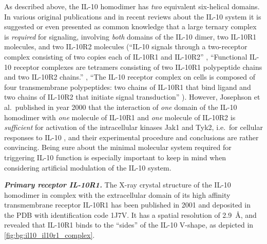As described above, the IL-10 homodimer has \textit{two} equivalent six-helical
domains. In various original publications and in recent reviews about the IL-10
system it is suggested or even presented as common knowledge that a large
ternary complex is \textit{required} for signaling, involving \textit{both}
domains of the IL-10 dimer, two IL-10R1 molecules, and two IL-10R2 molecules
(\enquote{IL-10 signals through a two-receptor complex consisting of two copies
each of IL-10R1 and IL-10R2} \cite{mosser_il10_newperspectives_2008},
\enquote{Functional IL-10 receptor complexes are tetramers consisting
of two IL-10R1 polypeptide chains and two IL-10R2 chains.}
\cite{donnelly_finbloom_il10_1999}, \enquote{The IL-10 receptor complex on cells
is composed of four transmembrane polypeptides: two chains of IL-10R1 that bind
ligand and two chains of IL-10R2 that initiate signal transduction}
\cite{pestka_2004_il10_receptors_review}). However, Josephson et al.\ published
in year 2000 that the interaction of \textit{one} domain of the IL-10 homodimer
with \textit{one} molecule of IL-10R1 and \textit{one} molecule of IL-10R2 is
\textit{sufficient} for activation of the intracellular kinases Jak1 and Tyk2,
i.e.\ for cellular responses to IL-10 \cite{il10_monomer_2000}, and their
experimental procedure and conclusions are rather convincing. Being sure about
the minimal molecular system required for triggering IL-10 function is
especially important to keep in mind when considering artificial modulation of
the IL-10 system.

\vspace{0.5cm}
\textit{\textbf{Primary receptor IL-10R1.}} The X-ray crystal structure of the
IL-10 homodimer in complex with the extracellular domain of its high affinity
transmembrane receptor IL-10R1 has been published in 2001 \cite{Josephson2001}
and deposited in the PDB with identification code 1J7V. It has a spatial
resolution of \SI{2.9}{\angstrom}, and revealed that IL-10R1 binds to the
\enquote{sides} of the IL-10 V-shape, as depicted in
\cref{fig:bg:il10_il10r1_complex}.

